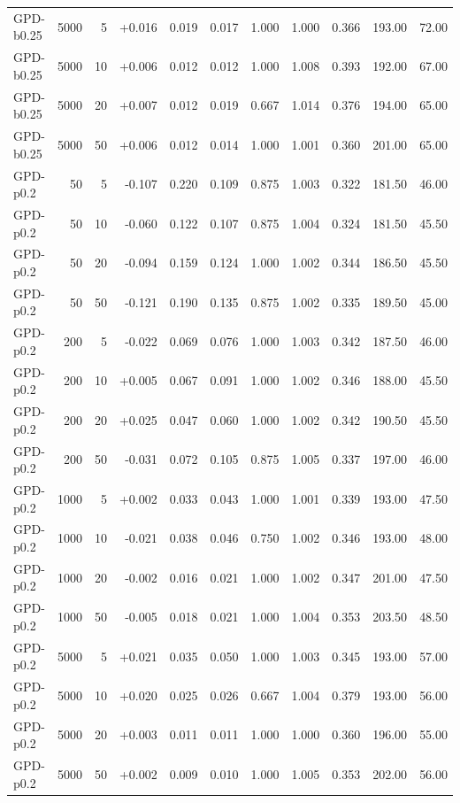 \begin{table}[t]
\begin{tabular}{lrrrrrrrrrr}
GPD-b0.25 & 5000 &    5 & +0.016 & 0.019 & 0.017 & 1.000 & 1.000 & 0.366 & 193.00 & 72.00 \\
GPD-b0.25 & 5000 &   10 & +0.006 & 0.012 & 0.012 & 1.000 & 1.008 & 0.393 & 192.00 & 67.00 \\
GPD-b0.25 & 5000 &   20 & +0.007 & 0.012 & 0.019 & 0.667 & 1.014 & 0.376 & 194.00 & 65.00 \\
GPD-b0.25 & 5000 &   50 & +0.006 & 0.012 & 0.014 & 1.000 & 1.001 & 0.360 & 201.00 & 65.00 \\
GPD-p0.2 &   50 &    5 & -0.107 & 0.220 & 0.109 & 0.875 & 1.003 & 0.322 & 181.50 & 46.00 \\
GPD-p0.2 &   50 &   10 & -0.060 & 0.122 & 0.107 & 0.875 & 1.004 & 0.324 & 181.50 & 45.50 \\
GPD-p0.2 &   50 &   20 & -0.094 & 0.159 & 0.124 & 1.000 & 1.002 & 0.344 & 186.50 & 45.50 \\
GPD-p0.2 &   50 &   50 & -0.121 & 0.190 & 0.135 & 0.875 & 1.002 & 0.335 & 189.50 & 45.00 \\
GPD-p0.2 &  200 &    5 & -0.022 & 0.069 & 0.076 & 1.000 & 1.003 & 0.342 & 187.50 & 46.00 \\
GPD-p0.2 &  200 &   10 & +0.005 & 0.067 & 0.091 & 1.000 & 1.002 & 0.346 & 188.00 & 45.50 \\
GPD-p0.2 &  200 &   20 & +0.025 & 0.047 & 0.060 & 1.000 & 1.002 & 0.342 & 190.50 & 45.50 \\
GPD-p0.2 &  200 &   50 & -0.031 & 0.072 & 0.105 & 0.875 & 1.005 & 0.337 & 197.00 & 46.00 \\
GPD-p0.2 & 1000 &    5 & +0.002 & 0.033 & 0.043 & 1.000 & 1.001 & 0.339 & 193.00 & 47.50 \\
GPD-p0.2 & 1000 &   10 & -0.021 & 0.038 & 0.046 & 0.750 & 1.002 & 0.346 & 193.00 & 48.00 \\
GPD-p0.2 & 1000 &   20 & -0.002 & 0.016 & 0.021 & 1.000 & 1.002 & 0.347 & 201.00 & 47.50 \\
GPD-p0.2 & 1000 &   50 & -0.005 & 0.018 & 0.021 & 1.000 & 1.004 & 0.353 & 203.50 & 48.50 \\
GPD-p0.2 & 5000 &    5 & +0.021 & 0.035 & 0.050 & 1.000 & 1.003 & 0.345 & 193.00 & 57.00 \\
GPD-p0.2 & 5000 &   10 & +0.020 & 0.025 & 0.026 & 0.667 & 1.004 & 0.379 & 193.00 & 56.00 \\
GPD-p0.2 & 5000 &   20 & +0.003 & 0.011 & 0.011 & 1.000 & 1.000 & 0.360 & 196.00 & 55.00 \\
GPD-p0.2 & 5000 &   50 & +0.002 & 0.009 & 0.010 & 1.000 & 1.005 & 0.353 & 202.00 & 56.00 \\
\bottomrule
\end{tabular}
\end{table}
